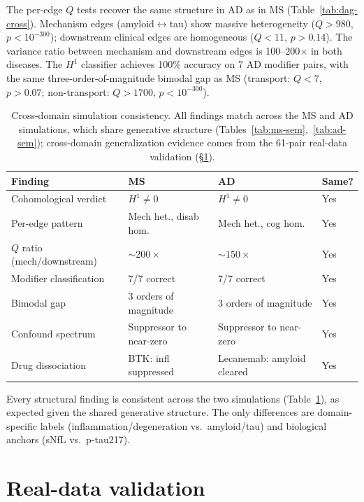 \documentclass[11pt]{article}
\begin{document}
The per-edge $Q$ tests recover the same structure in AD as in MS (Table~\ref{tab:dag-cross}).
Mechanism edges (amyloid$\leftrightarrow$tau) show massive heterogeneity ($Q > 980$, $p < 10^{-300}$); downstream clinical edges are homogeneous ($Q < 11$, $p > 0.14$).
The variance ratio between mechanism and downstream edges is 100--200$\times$ in both diseases.
The $H^1$ classifier achieves 100\% accuracy on 7 AD modifier pairs, with the same three-order-of-magnitude bimodal gap as MS (transport: $Q < 7$, $p > 0.07$; non-transport: $Q > 1700$, $p < 10^{-300}$).

\begin{table}[t]
\centering
\caption{Cross-domain simulation consistency. All findings match across the MS and AD simulations, which share generative structure (Tables~\ref{tab:ms-sem},~\ref{tab:ad-sem}); cross-domain generalization evidence comes from the 61-pair real-data validation (\S\ref{sec:realdata}).}
\label{tab:cross-summary}
\small
\begin{tabular}{@{}llll@{}}
\toprule
\textbf{Finding} & \textbf{MS} & \textbf{AD} & \textbf{Same?} \\
\midrule
Cohomological verdict & $H^1 \neq 0$ & $H^1 \neq 0$ & Yes \\
Per-edge pattern & Mech het., disab hom. & Mech het., cog hom. & Yes \\
$Q$ ratio (mech/downstream) & $\sim\!200\times$ & $\sim\!150\times$ & Yes \\
Modifier classification & 7/7 correct & 7/7 correct & Yes \\
Bimodal gap & 3 orders of magnitude & 3 orders of magnitude & Yes \\
Confound spectrum & Suppressor to near-zero & Suppressor to near-zero & Yes \\
Drug dissociation & BTK: infl suppressed & Lecanemab: amyloid cleared & Yes \\
\bottomrule
\end{tabular}
\end{table}

Every structural finding is consistent across the two simulations (Table~\ref{tab:cross-summary}), as expected given the shared generative structure.
The only differences are domain-specific labels (inflammation/degeneration vs.\ amyloid/tau) and biological anchors (sNfL vs.\ p-tau217).

\section{Real-data validation}
\label{sec:realdata}
\end{document}

